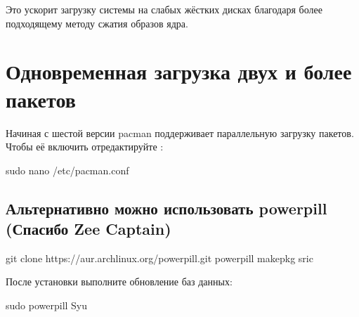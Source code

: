 \documentclass[letterpaper,10pt,russian,openany]{sphinxmanual}
\begin{document}
\sphinxAtStartPar
Это ускорит загрузку системы на слабых жёстких дисках благодаря более подходящему методу сжатия образов ядра.

\ignorespaces 

\section{Одновременная загрузка двух и более пакетов}
\label{\detokenize{source/generic-system-acceleration:parallel-downloading}}\label{\detokenize{source/generic-system-acceleration:index-10}}\label{\detokenize{source/generic-system-acceleration:id6}}
\sphinxAtStartPar
Начиная с шестой версии pacman поддерживает параллельную загрузку пакетов.
Чтобы её включить отредактируйте :

\begin{sphinxVerbatim}[commandchars=\\\{\}]
sudo nano /etc/pacman.conf 

  
\end{sphinxVerbatim}

\ignorespaces 

\subsection{Альтернативно можно использовать powerpill (Спасибо Zee Captain)}
\label{\detokenize{source/generic-system-acceleration:powerpill-zee-captain}}\label{\detokenize{source/generic-system-acceleration:powerpill}}\label{\detokenize{source/generic-system-acceleration:index-11}}
\begin{sphinxVerbatim}[commandchars=\\\{\}]
git clone https://aur.archlinux.org/powerpill.git
 powerpill
makepkg \PYGZhy{}sric
\end{sphinxVerbatim}

\sphinxAtStartPar
После установки выполните обновление баз данных:

\begin{sphinxVerbatim}[commandchars=\\\{\}]
sudo powerpill \PYGZhy{}Syu
\end{sphinxVerbatim}
\end{document}
